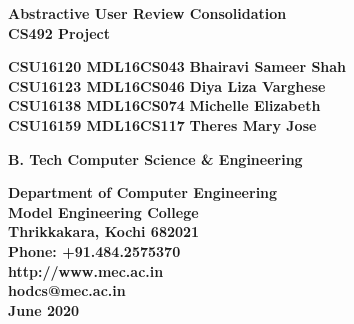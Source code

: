 \documentclass[11pt]{report}
\begin{document}
\graphicspath{ {images/} }
\renewcommand\bibname{References}
\pagestyle{fancy}
\fancyhead{}
\fancyfoot{}
\fancyfoot[c]{\thepage}
\renewcommand{\chaptermark}[1]{
\markboth{\thechapter.\ #1}{}} 
\renewcommand{\headrulewidth}{0.1pt}
\fancyhead[r]{\slshape \leftmark}
\addtolength{\headheight}{\baselineskip}
\addtolength{\headsep}{.1in}
\lhead{\nouppercase{\rightmark}}
\rhead{\nouppercase{\leftmark}}

\begin{titlepage}
\begin{center}

\Huge{\textbf{Abstractive User Review Consolidation}}\\
\vspace{0.05in}
\large{\textbf{CS492 Project\\}}
\vspace{1.2in}

\Large{\textbf{CSU16120 MDL16CS043}} 	\hspace{.1in}	\Large{\textbf{Bhairavi Sameer Shah}}\\ 
\Large{\textbf{CSU16123 MDL16CS046}}	\hspace{.1in}	\Large{\textbf{Diya Liza Varghese}}\\ 
\Large{\textbf{CSU16138 MDL16CS074}}	\hspace{.1in}	\Large{\textbf{Michelle Elizabeth}}\\ 
\Large{\textbf{CSU16159 MDL16CS117}}	\hspace{.1in}	\Large{\textbf{Theres Mary Jose}}

\Large{\textbf{B. Tech Computer Science \& Engineering}}


\vspace{1in}
\begin{figure}[h]
\begin{center}
\end{center}
\end{figure}
\textbf{
Department of Computer Engineering\\
Model Engineering College\\
Thrikkakara, Kochi 682021\\
Phone: +91.484.2575370\\
http://www.mec.ac.in \\
hodcs@mec.ac.in\\
\vspace{0.7in}
{\upshape June 2020}
}
\end{center}
\end{titlepage}
\end{document}
